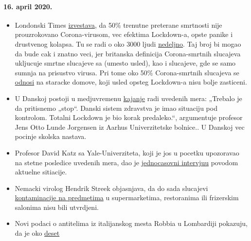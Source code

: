 \hypertarget{16-april-2020}{%
\paragraph{16. april 2020.}\label{16-april-2020}}

\begin{itemize}
\tightlist
\item
  Londonski Times \href{https://archive.is/2eKCW}{izvestava}, da 50\%
  trenutne preterane smrtnosti nije prouzrokovano Corona-virusom, vec
  efektima Lockdown-a, opste panike i drustvenog kolapsa. Tu se radi o
  oko 3000 ljudi
  \href{https://www.ons.gov.uk/peoplepopulationandcommunity/birthsdeathsandmarriages/deaths/bulletins/deathsregisteredweeklyinenglandandwalesprovisional/weekending3april2020}{nedeljno}.
  Taj broj bi mogao da bude cak i znatno veci, jer britanska definicija
  Corona-smrtnih slucajeva ukljucuje smrtne slucajeve sa (umesto usled),
  kao i slucajeve, gde se samo sumnja na prisustvo virusa. Pri tome oko
  50\% Corona-smrtnih slucajeva se
  \href{https://ltccovid.org/2020/04/12/mortality-associated-with-covid-19-outbreaks-in-care-homes-early-international-evidence/}{odnosi}
  na staracke domove, koji usled opsteg Lockdown-a nisu bolje zasticeni.
\item
  U Danskoj postoji u medjuvremenu
  \href{https://jyllands-posten.dk/debat/breve/ECE12074246/vi-skulle-aldrig-have-trykket-paa-stopknappen/}{kajanje}
  radi uvedenih mera: „Trebalo je da pritisnemo „stop``. Danski sistem
  zdravstva je imao situaciju pod kontrolom. Totalni Lockdown je bio
  korak predaleko.``, argumentuje profesor Jens Otto Lunde Jorgensen iz
  Aarhus Univerzitetske bolnice.. U Danskoj vec pocinje skolska nastava.
\item
  Profesor David Katz sa Yale-Univerziteta, koji je jos u pocetku
  upozoravao na stetne posledice uvedenih mera, dao je
  \href{https://www.youtube.com/watch?v=VK0Wtjh3HVA}{jednocasovni
  intervjuu} povodom aktuelne sitiacije.
\item
  Nemacki virolog Hendrik Streek objasnjava, da do sada slucajevi
  \href{https://today.rtl.lu/news/science-and-environment/a/1498185.html}{kontaminacije
  na predmetima} u supermarketima, restoranima ili frizerskim salonima
  nisu bili utvrdjeni.
\item
  Novi podaci o antitelima iz italijanskog mesta Robbia u Lombardiji
  pokazuju, da je oko
  \href{https://www.tgcom24.mediaset.it/cronaca/a-robbio-pv-il-22-ha-o-ha-avuto-il-coronavirus-ok-del-sindaco-ai-test-per-tutti_17285128-202002a.shtml}{deset
}
\end{itemize}
